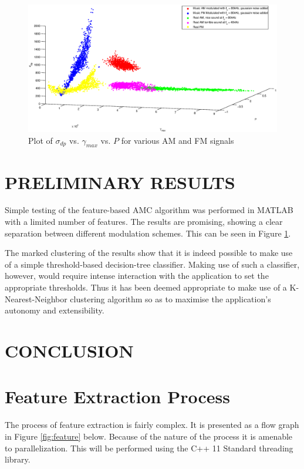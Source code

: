 \documentclass[10pt,onecolumn]{witseiepaper}
\begin{document}
	\begin{figure}[h]
		\centering
		\includegraphics[width=1\textwidth]{plot0.eps}
		\caption{Plot of $\sigma_{dp}$ vs. $\gamma_{max}$ vs. $P$ for various AM and FM signals}
		\label{fig:plot0}
	\end{figure}
\begin{multicols}{2}

\section{PRELIMINARY RESULTS}
	Simple testing of the feature-based AMC algorithm was performed in MATLAB with a limited number of features. The results are promising, showing a clear separation between different modulation schemes. This can be seen in Figure \ref{fig:plot0}. 

	The marked clustering of the results show that it is indeed possible to make use of a simple threshold-based decision-tree classifier. Making use of such a classifier, however, would require intense interaction with the application to set the appropriate thresholds. Thus it has been deemed appropriate to make use of a K-Nearest-Neighbor clustering algorithm so as to maximise the application's autonomy and extensibility.

\section{CONCLUSION}



 
\end{multicols}
\newpage

\appendix
{}
\section{Feature Extraction Process}
\label{app:feature}
The process of feature extraction is fairly complex. It is presented as a flow graph in Figure \ref{fig:feature} below. Because of the nature of the process it is amenable to parallelization. This will be performed using the C++ 11 Standard threading library.
\end{document}
